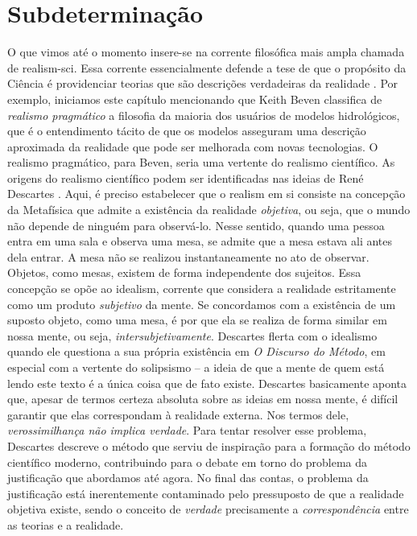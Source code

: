 \documentclass[./main.tex]{subfiles}
\begin{document}
\section{Subdeterminação} \label{episteme:under}

\par O que vimos até o momento insere-se na corrente filosófica mais ampla chamada de \gls{realism-sci}. Essa corrente essencialmente defende a tese de que o propósito da Ciência é providenciar teorias que são descrições verdadeiras da realidade \cite{bas1980}. Por exemplo, iniciamos este capítulo mencionando que Keith Beven classifica de \textit{realismo pragmático} a filosofia da maioria dos usuários de modelos hidrológicos, que é o entendimento tácito de que os modelos asseguram uma descrição aproximada da realidade que pode ser melhorada com novas tecnologias. O realismo pragmático, para Beven, seria uma vertente do realismo científico. As origens do realismo científico podem ser identificadas nas ideias de René Descartes \cite{Agazzi2017}. Aqui, é preciso estabelecer que o \gls{realism} em si consiste na concepção da Metafísica que admite a existência da realidade \textit{objetiva}, ou seja, que o mundo não depende de ninguém para observá-lo. Nesse sentido, quando uma pessoa entra em uma sala e observa uma mesa, se admite que a mesa estava ali antes dela entrar. A mesa não se realizou instantaneamente no ato de observar. Objetos, como mesas, existem de forma independente dos sujeitos. Essa concepção se opõe ao \gls{idealism}, corrente que considera a realidade estritamente como um produto \textit{subjetivo} da mente. Se concordamos com a existência de um suposto objeto, como uma mesa, é por que ela se realiza de forma similar em nossa mente, ou seja, \textit{intersubjetivamente}. Descartes flerta com o idealismo quando ele questiona a sua própria existência em \textit{O Discurso do Método}, em especial com a vertente do solipsismo -- a ideia de que a mente de quem está lendo este texto é a única coisa que de fato existe. Descartes basicamente aponta que, apesar de termos certeza absoluta sobre as ideias em nossa mente, é difícil garantir que elas correspondam à realidade externa. Nos termos dele, \textit{verossimilhança não implica verdade}. Para tentar resolver esse problema, Descartes descreve o método que serviu de inspiração para a formação do método científico moderno, contribuindo para o debate em torno do problema da justificação que abordamos até agora. No final das contas, o problema da justificação está inerentemente contaminado pelo pressuposto de que a realidade objetiva existe, sendo o conceito de \textit{verdade} precisamente a \textit{correspondência} entre as teorias e a realidade.
\end{document}
